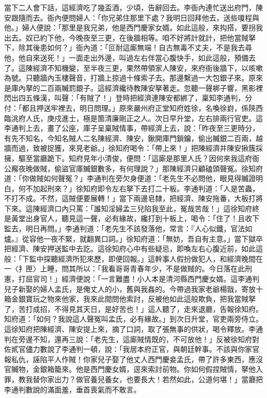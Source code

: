 \begin{showcontents}{}
當下二人會下話，這經濟吃了幾盃酒，少頃，告辭回去。李衙內連忙送出府門，陳安跟隨而去。衙內便問婦人：「你兄弟住那里下處？我明日回拜他去，送些嗄程與他。」婦人便說：「那里是我兄弟，他是西門慶家女婿。如此這般，來抅搭，要拐我出去。奴已約下他，今晚夜至三更，在後牆相等。咱不好將計就計，把他當賊拏下，除其後患如何？」衙內道：「叵耐這廝無端！自古無毒不丈夫，不是我去尋他，他自來送死！」一面走出外邊，叫過左右伴當心腹快手，如此這般，預備去了。這陳經濟不知機變，至半夜三更，果然帶領家人陳安，來府衙後牆下，以咳嗽為號。只聽牆內玉樓聲音，打牆上掠過十條索子去。那邊繫過一大包銀子來。原來是庫內拏的二百兩贓罰銀子。這經濟纔待教陳安拏著走。忽聽一聲梆子響，黑影裡閃出四五條漢，叫聲：「有賊了！」登時把經濟連陳安都綁了，稟知李通判，分付：「都且押送牢裡去，明日問理。」原來嚴州府正堂知府姓徐，名喚徐崶，係陝西臨洮府人氏，庚戍進士，極是箇清廉剛正之人。次日早升堂，左右排兩行官吏。這李通判上去，畫了公座，庫子呈稟賊情事，帶經濟上去，說：「昨夜至三更時分，有先不知名，今知名賊人二名陳經濟、陳安，鍬開庫門鎖鑰，偷出贓銀二百兩，越牆而過，致被捉獲，來見老爺。」徐知府喝令：「帶上來！」把陳經濟并陳安揪簇採擁，驅至當廳跪下。知府見年小清俊，便問：「這廝是那里人氏？因何來我這府衙公廨夜晚做賊，偷盜官庫贓銀數多，有何理說？」那陳經濟只顧磕頭聲冤。徐知府道：「你做賊如何聲冤？」李通判在旁欠身便道：「老先生不必問他，眼見得贓證明白，何不加起刑來？」徐知府即令左右拏下去打二十板。李通判道：「人是苦蟲，不打不成。不然，這賊便要展轉！」當下兩邊皂隸，把經濟、陳安拖番，大板打將下來。這陳經濟口內只罵：「誰知淫婦孟三兒陷我至此，冤哉苦哉！」這徐知府終是黃堂出身官人，聽見這一聲，必有緣故，纔打到十板上，喝令：「住了！且收下監去，明日再問。」李通判道：「老先生不該發落他，常言：『人心似鐵，官法如爐。』從容他一夜不緊，就翻異口詞。」徐知府道：「無妨，吾自有主意。」當下獄卒把經濟、陳安押送監中去訖。這徐知府心中有些疑忌，即喚左右心腹近前，如此這般：「下監中探聽經濟所犯來歷，即便回報。」這幹事人假扮做犯人，和經濟晚間在一〈扌匣〉上睡，問其所以：「我看哥哥青春年少，不是做賊的。今日落在此刑憲，打屈官司！」經濟便說：「一言難盡！小人本是清河縣西門慶女婿。這李通判兒子新娶的婦人孟氏，是俺丈人的小，舊與我姦的。今帶過我家老爺楊戩，寄放十箱金銀寶玩之物來他家，我來此間問他索討，反被他如此這般欺負，把我當賊拏了，苦打成招，不得見其天日，是好苦也！」這人聽了，走來退廳，告報徐知府。知府道：「如何？我說這人聲冤叫孟氏，必有緣故。」到次日升堂，官吏兩旁侍立。這徐知府把陳經濟、陳安提上來，摘了口詞，取了張無事的供狀，喝令釋放。李通判在旁邊不知，還再三說：「老先生，這廝賊情既的，不可放他！」反被徐知府對佐貳官儘力數說了李通判一頓，說：「我居本府正官，與朝廷幹事。不該與你家官報私仇，誣陷平人作賊！你家兒子娶了他丈人西門慶妾孟氏，帶了許多東西，應沒官贓物，金銀箱籠來。他是西門慶女婿，逕來索討前物。你如何假捏賊情，拏他入罪，教我替你家出力？做官養兒養女，也要長大！若然如此，公道何堪！」當廳把李通判數說的滿面羞，垂首喪氣而不敢言。


\end{showcontents}
